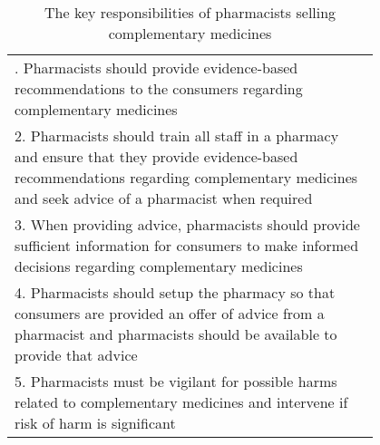 \begin{table}
\centering
\begin{tabular}{p{0.8\linewidth}}
\hline\T
1. Pharmacists should provide evidence-based recommendations to the consumers regarding complementary medicines\\[10pt]
2. Pharmacists should train all staff in a pharmacy and ensure that they provide evidence-based recommendations regarding complementary medicines and seek advice of a pharmacist when required\\[10pt]
3. When providing advice, pharmacists should provide sufficient information for consumers to make informed decisions regarding complementary medicines\\[10pt]
4. Pharmacists should setup the pharmacy so that consumers are provided an offer of advice from a pharmacist and pharmacists should be available to provide that advice\\[10pt]
5. Pharmacists must be vigilant for possible harms related to complementary medicines and intervene if risk of harm is significant\B\\
\hline
\end{tabular}
\caption{The key responsibilities of pharmacists selling complementary medicines}
\label{responsibilities}
\end{table}
